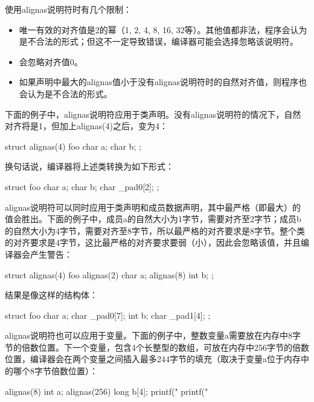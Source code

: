 使用alignas说明符时有几个限制：

\begin{itemize}
\item
唯一有效的对齐值是2的幂（1, 2, 4, 8, 16, 32等）。其他值都非法，程序会认为是不合法的形式；但这不一定导致错误，编译器可能会选择忽略该说明符。

\item
会忽略对齐值0。

\item
如果声明中最大的alignas值小于没有alignas说明符时的自然对齐值，则程序也会认为是不合法的形式。
\end{itemize}

下面的例子中，alignas说明符应用于类声明。没有alignas说明符的情况下，自然对齐将是1，但加上alignas(4)之后，变为4：

\begin{cpp}
struct alignas(4) foo
{
    char a;
    char b;
};
\end{cpp}

换句话说，编译器将上述类转换为如下形式：

\begin{cpp}
struct foo
{
    char a;
    char b;
    char _pad0[2];
};
\end{cpp}

alignas说明符可以同时应用于类声明和成员数据声明，其中最严格（即最大）的值会胜出。下面的例子中，成员a的自然大小为1字节，需要对齐至2字节；成员b的自然大小为4字节，需要对齐至8字节，所以最严格的对齐要求是8字节。整个类的对齐要求是4字节，这比最严格的对齐要求要弱（小），因此会忽略该值，并且编译器会产生警告：

\begin{cpp}
struct alignas(4) foo
{
    alignas(2) char a;
    alignas(8) int  b;
};
\end{cpp}

结果是像这样的结构体：

\begin{cpp}
struct foo
{
    char a;
    char _pad0[7];
    int b;
    char _pad1[4];
};
\end{cpp}

alignas说明符也可以应用于变量。下面的例子中，整数变量a需要放在内存中8字节的倍数位置。下一个变量，包含4个长整型的数组，可放在内存中256字节的倍数位置，编译器会在两个变量之间插入最多244字节的填充（取决于变量a位于内存中的哪个8字节倍数位置）：

\begin{cpp}
alignas(8)   int a;
alignas(256) long b[4];
printf("%
printf("%
\end{cpp}

